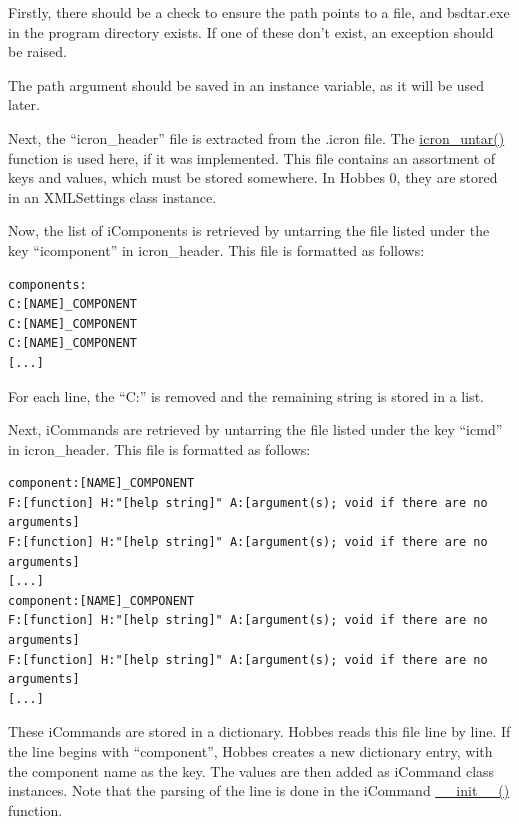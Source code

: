 \documentclass[12pt,letterpaper]{article}
\begin{document}
Firstly, there should be a check to ensure the path points to a file, and bsdtar.exe in the program directory exists. If one of these don't exist, an exception should be raised.

The path argument should be saved in an instance variable, as it will be used later.

Next, the ``icron\_header'' file is extracted from the .icron file. The \hyperref[4.3.1.2.4]{icron\_untar()} function is used here, if it was implemented. This file contains an assortment of keys and values, which must be stored somewhere. In Hobbes 0, they are stored in an XMLSettings class instance.

Now, the list of iComponents is retrieved by untarring the file listed under the key ``icomponent'' in icron\_header. This file is formatted as follows:

\selectfont

\begin{lstlisting}
components:
C:[NAME]_COMPONENT
C:[NAME]_COMPONENT
C:[NAME]_COMPONENT
[...]
\end{lstlisting}

\selectfont

For each line, the ``C:'' is removed and the remaining string is stored in a list.

Next, iCommands are retrieved by untarring the file listed under the key ``icmd'' in icron\_header. This file is formatted as follows:

\selectfont

\begin{lstlisting}
component:[NAME]_COMPONENT
F:[function] H:"[help string]" A:[argument(s); void if there are no arguments]
F:[function] H:"[help string]" A:[argument(s); void if there are no arguments]
[...]
component:[NAME]_COMPONENT
F:[function] H:"[help string]" A:[argument(s); void if there are no arguments]
F:[function] H:"[help string]" A:[argument(s); void if there are no arguments]
[...]
\end{lstlisting}

\selectfont

These iCommands are stored in a dictionary. Hobbes reads this file line by line. If the line begins with ``component'', Hobbes creates a new dictionary entry, with the component name as the key. The values are then added as iCommand class instances. Note that the parsing of the line is done in the iCommand \hyperref[4.5.1.0.0]{\_\_init\_\_()} function.
\end{document}
